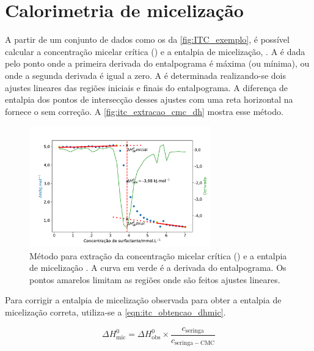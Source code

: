 		\FloatBarrier
		
		\section{Calorimetria de micelização} 
		\label{sec:calorimetria_micelizacao}
		A partir de um conjunto de dados como os da \autoref{fig:ITC_exemplo}, é possível calcular a concentração micelar crítica (\cmc) e a entalpia de micelização, \DHmic. A \cmc{} é dada pelo ponto onde a primeira derivada do entalpograma é máxima (ou mínima)\cite{Bouchemal2010a}, ou onde a segunda derivada é igual a zero.\cite{Sarac2009}  A \DHmic{} é determinada realizando-se dois ajustes lineares das regiões iniciais e finais do entalpograma.\cite{Loh2016} A diferença de entalpia dos pontos de intersecção desses ajustes com uma reta horizontal na \cmc{} fornece o \DHmic{} sem correção.  A \autoref{fig:itc_extracao_cmc_dh} mostra esse método.
		
		\begin{figure}[h] 
			\centering
			\includegraphics[width=0.7\textwidth]{imagens/itc/extracao_cmc_dh_exemplo}
			\caption{Método para extração da concentração micelar crítica (\cmc) e a entalpia de micelização \DHmic. A curva em verde é a derivada do entalpograma. Os pontos amarelos limitam as regiões onde são feitos ajustes lineares.}
			\label{fig:itc_extracao_cmc_dh}
		\end{figure} 

		Para corrigir a entalpia de micelização observada para obter a entalpia de micelização correta, utiliza-se a \autoref{eqn:itc_obtencao_dhmic}.\cite{Loh2016}  
		
		\begin{equation}
			\Delta H^0_{\textrm{mic}} = \Delta H^0_{\textrm{obs}} \times \dfrac{c_{\textrm{seringa}}}{c_{\textrm{seringa}-\mathrm{CMC}}}
			\label{eqn:itc_obtencao_dhmic}
		\end{equation}  %
		
